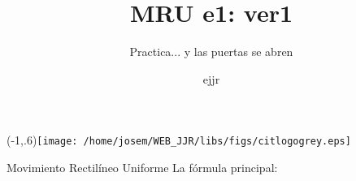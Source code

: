 \documentclass[%
final,
total,
slideBW,
colorBG,
pdf,
accumulate,
]{prosper}
\title{MRU e1: ver1}
\subtitle{Practica... y las puertas se abren}
\author{ejjr}
\begin{document}
\maketitle

\Logo(-1,.6){\texttt{[image: /home/josem/WEB\_JJR/libs/figs/citlogogrey.eps]}}


\begin{slide}{Movimiento Rectil\'ineo Uniforme}
% 
 La f\'ormula principal:

                                                               
 
{\huge \vmru}
\vNUa
                                                               
                                                               
                                                               
                                                               
\end{slide}
\end{document}
